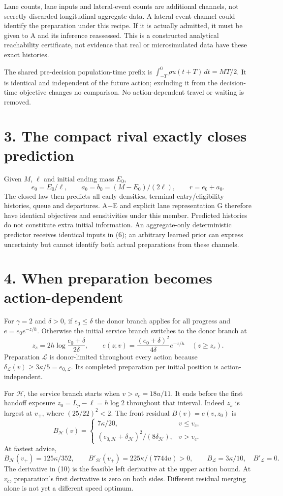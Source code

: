 \documentclass[11pt,a4paper]{article}
\begin{document}
Lane counts, lane inputs and lateral-event counts are additional channels,
not secretly discarded longitudinal aggregate data. A lateral-event channel
could identify the preparation under this recipe. If it is actually admitted,
it must be given to A and its inference reassessed.
This is a constructed analytical reachability certificate, not evidence that
real or microsimulated data have these exact histories.

The shared pre-decision population-time prefix is
$\int_{-T}^0\rho u(t+T)\,dt=MT/2$. It is identical and independent of the
future action; excluding it from the decision-time objective changes no
comparison. No action-dependent travel or waiting is removed.

\section*{3. The compact rival exactly closes prediction}
Given $M$, $\ell$ and initial ending mass $E_0$,
\[
 e_0=E_0/\ell,\qquad
 a_0=b_0=(M-E_0)/(2\ell),\qquad r=e_0+a_0.
 \tag{7}
\]
The closed law then predicts all early densities, terminal entry/eligibility
histories, queue and departures. A+E and explicit lane representation G
therefore have identical objectives and sensitivities under this member.
Predicted histories do not constitute extra initial information.
An aggregate-only deterministic predictor receives identical inputs in
(6); an arbitrary learned prior can express uncertainty but cannot identify
both actual preparations from these channels.

\section*{4. When preparation becomes action-dependent}
For $\gamma=2$ and $\delta>0$, if $e_0\leq\delta$ the donor branch applies
for all progress and $e=e_0e^{-z/h}$. Otherwise the initial service branch
switches to the donor branch at
\[
 z_s=2h\log\frac{e_0+\delta}{2\delta},\qquad
 e(z;v)=\frac{(e_0+\delta)^2}{4\delta}e^{-z/h}
 \quad(z\geq z_s).
 \tag{8}
\]
Preparation $\mathcal L$ is donor-limited throughout every action because
$\delta_{\mathcal L}(v)\geq3\kappa/5=e_{0,\mathcal L}$.
Its completed preparation per initial position is action-independent.

For $\mathcal H$, the service branch starts when $v>v_c=18u/11$.
It ends before the first handoff exposure $z_0=L_p-\ell=h\log2$ throughout
that interval. Indeed $z_s$ is largest at $v_+$, where
$(25/22)^2<2$. The front residual $B(v)=e(v,z_0)$ is
\[
 B_{\mathcal H}(v)=
 \begin{cases}
 7\kappa/20,&v\leq v_c,\\
 (e_{0,\mathcal H}+\delta_{\mathcal H})^2/(8\delta_{\mathcal H}),
       &v>v_c .
 \end{cases}
 \tag{9}
\]
At fastest advice,
\[
 B_{\mathcal H}(v_+)=125\kappa/352,\qquad
 B'_{\mathcal H}(v_+)=225\kappa/(7744u)>0,\qquad
 B_{\mathcal L}=3\kappa/10,\quad B'_{\mathcal L}=0.
 \tag{10}
\]
The derivative in (10) is the feasible left derivative at the upper action
bound. At $v_c$, preparation's first derivative is zero on both sides.
Different residual merging alone is not yet a different speed optimum.
\end{document}
